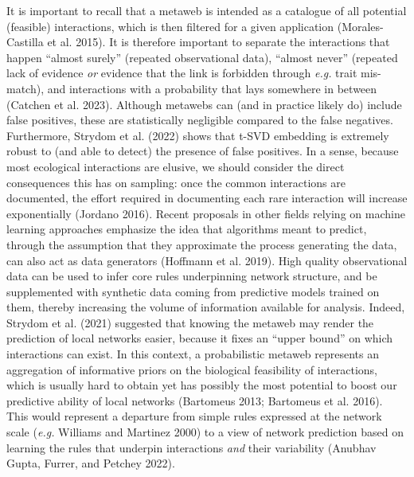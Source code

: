 \documentclass[
  letterpaper,
  DIV=11,
  numbers=noendperiod]{scrartcl}
\begin{document}
It is important to recall that a metaweb is intended as a catalogue of
all potential (feasible) interactions, which is then filtered for a
given application (Morales-Castilla et al. 2015). It is therefore
important to separate the interactions that happen ``almost surely''
(repeated observational data), ``almost never'' (repeated lack of
evidence \emph{or} evidence that the link is forbidden through
\emph{e.g.} trait mis-match), and interactions with a probability that
lays somewhere in between (Catchen et al. 2023). Although metawebs can
(and in practice likely do) include false positives, these are
statistically negligible compared to the false negatives. Furthermore,
Strydom et al. (2022) shows that t-SVD embedding is extremely robust to
(and able to detect) the presence of false positives. In a sense,
because most ecological interactions are elusive, we should consider the
direct consequences this has on sampling: once the common interactions
are documented, the effort required in documenting each rare interaction
will increase exponentially (Jordano 2016). Recent proposals in other
fields relying on machine learning approaches emphasize the idea that
algorithms meant to predict, through the assumption that they
approximate the process generating the data, can also act as data
generators (Hoffmann et al. 2019). High quality observational data can
be used to infer core rules underpinning network structure, and be
supplemented with synthetic data coming from predictive models trained
on them, thereby increasing the volume of information available for
analysis. Indeed, Strydom et al. (2021) suggested that knowing the
metaweb may render the prediction of local networks easier, because it
fixes an ``upper bound'' on which interactions can exist. In this
context, a probabilistic metaweb represents an aggregation of
informative priors on the biological feasibility of interactions, which
is usually hard to obtain yet has possibly the most potential to boost
our predictive ability of local networks (Bartomeus 2013; Bartomeus et
al. 2016). This would represent a departure from simple rules expressed
at the network scale (\emph{e.g.} Williams and Martinez 2000) to a view
of network prediction based on learning the rules that underpin
interactions \emph{and} their variability (Anubhav Gupta, Furrer, and
Petchey 2022).
\end{document}
